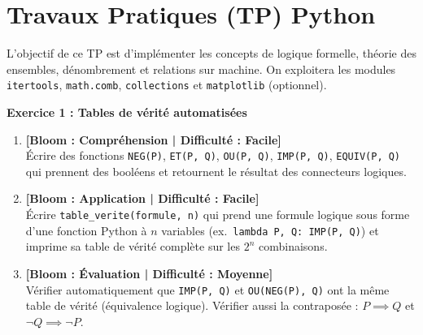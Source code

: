 \documentclass[12pt,a4paper]{report}
\begin{document}
\section*{Travaux Pratiques (TP) Python}

\vspace{0.3cm}
\noindent L'objectif de ce TP est d'implémenter les concepts de logique formelle, théorie des ensembles, dénombrement et relations sur machine. On exploitera les modules \texttt{itertools}, \texttt{math.comb}, \texttt{collections} et \texttt{matplotlib} (optionnel).

\vspace{0.3cm}

\noindent\textbf{Exercice 1 : Tables de vérité automatisées}
\begin{enumerate}
    \item \textbf{[Bloom : Compréhension | Difficulté : Facile]} \\
    Écrire des fonctions \texttt{NEG(P)}, \texttt{ET(P, Q)}, \texttt{OU(P, Q)}, \texttt{IMP(P, Q)}, \texttt{EQUIV(P, Q)} qui prennent des booléens et retournent le résultat des connecteurs logiques.
    \item \textbf{[Bloom : Application | Difficulté : Facile]} \\
    Écrire \texttt{table\_verite(formule, n)} qui prend une formule logique sous forme d'une fonction Python à $n$ variables (ex.\ \texttt{lambda P, Q: IMP(P, Q)}) et imprime sa table de vérité complète sur les $2^n$ combinaisons.
    \item \textbf{[Bloom : Évaluation | Difficulté : Moyenne]} \\
    Vérifier automatiquement que \texttt{IMP(P, Q)} et \texttt{OU(NEG(P), Q)} ont la même table de vérité (équivalence logique). Vérifier aussi la contraposée : $P \implies Q$ et $\neg Q \implies \neg P$.
\end{enumerate}

\vspace{0.3cm}
\end{document}
